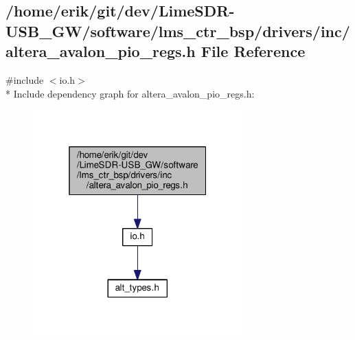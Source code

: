 \subsection{/home/erik/git/dev/\+Lime\+S\+D\+R-\/\+U\+S\+B\+\_\+\+G\+W/software/lms\+\_\+ctr\+\_\+bsp/drivers/inc/altera\+\_\+avalon\+\_\+pio\+\_\+regs.h File Reference}
\label{altera__avalon__pio__regs_8h}
{\ttfamily \#include $<$io.\+h$>$}\\*
Include dependency graph for altera\+\_\+avalon\+\_\+pio\+\_\+regs.\+h\+:
\nopagebreak
\begin{figure}[H]
\begin{center}
\leavevmode
\includegraphics[width=229pt]{dd/d11/altera__avalon__pio__regs_8h__incl}
\end{center}
\end{figure}

